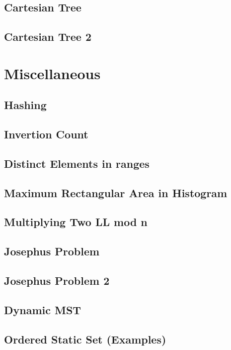 \subsection{Cartesian Tree}
\raggedbottom
\hrulefill
\subsection{Cartesian Tree 2}
\raggedbottom
\hrulefill

\section{Miscellaneous}
\subsection{Hashing}
\raggedbottom
\hrulefill
\subsection{Invertion Count}
\raggedbottom
\hrulefill
\subsection{Distinct Elements in ranges}
\raggedbottom
\hrulefill
\subsection{Maximum Rectangular Area in Histogram}
\raggedbottom
\hrulefill
\subsection{Multiplying Two LL mod n}
\raggedbottom
\hrulefill
\subsection{Josephus Problem}
\raggedbottom
\hrulefill
\subsection{Josephus Problem 2}
\raggedbottom
\hrulefill
\subsection{Dynamic MST}
\raggedbottom
\hrulefill
\subsection{Ordered Static Set (Examples)}
\raggedbottom
\hrulefill


